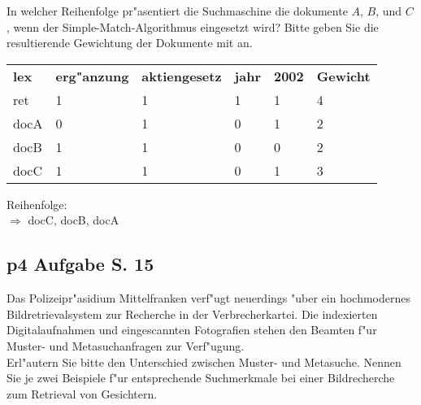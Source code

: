 \noindent
In welcher Reihenfolge pr"asentiert die Suchmaschine die dokumente $A$, $B$, und $C$, wenn der Simple-Match-Algorithmus eingesetzt wird?
Bitte geben Sie die resultierende Gewichtung der Dokumente mit an.\\

\begin{tabular}{ l l l l l l }
    \rowcolor{LightSlateGrey}
    \textbf{lex} & \textbf{erg"anzung} & \textbf{aktiengesetz} & \textbf{jahr} & \textbf{2002} & \textbf{Gewicht}\\
    ret     & 1 & 1 & 1 & 1 & 4\\
    docA    & 0 & 1 & 0 & 1 & 2\\
    docB    & 1 & 1 & 0 & 0 & 2\\
    docC    & 1 & 1 & 0 & 1 & 3\\
\end{tabular}

\bigskip
\noindent
Reihenfolge:\\
$\Rightarrow$ docC, docB, docA\\

\subsection{p4 Aufgabe S. 15}
Das Polizeipr"asidium Mittelfranken verf"ugt neuerdings "uber ein hochmodernes Bildretrievalsystem zur Recherche in der Verbrecherkartei.
Die indexierten Digitalaufnahmen und eingescannten Fotografien stehen den Beamten f"ur Muster- und Metasuchanfragen zur Verf"ugung.\\

\noindent
Erl"autern Sie bitte den Unterschied zwischen Muster- und Metasuche.
Nennen Sie je zwei Beispiele f"ur entsprechende Suchmerkmale bei einer Bildrecherche zum Retrieval von Gesichtern.

\begin{quote}
\end{quote}



































